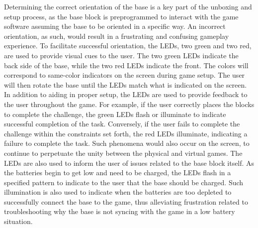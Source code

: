 \documentclass[]{article}
\begin{document}
Determining the correct orientation of the base is a key part of the unboxing and setup process, as the base block is preprogrammed to interact with the game software assuming the base to be oriented in a specific way.  An incorrect orientation, as such, would result in a frustrating and confusing gameplay experience.   To facilitate successful orientation, the LEDs, two green and two red, are used to provide visual cues to the user.  The two green LEDs indicate the back side of the base, while the two red LEDs indicate the front.  The colors will correspond to same-color indicators on the screen during game setup.  The user will then rotate the base until the LEDs match what is indicated on the screen.
In addition to aiding in proper setup, the LEDs are used to provide feedback to the user throughout the game.  For example, if the user correctly places the blocks to complete the challenge, the green LEDs flash or illuminate to indicate successful completion of the task.  Conversely, if the user fails to complete the challenge within the constraints set forth, the red LEDs illuminate, indicating a failure to complete the task.  Such phenomena would also occur on the screen, to continue to perpetuate the unity between the physical and virtual games.
The LEDs are also used to inform the user of issues related to the base block itself.  As the batteries begin to get low and need to be charged, the LEDs flash in a specified pattern to indicate to the user that the base should be charged.  Such illumination is also used to indicate when the batteries are too depleted to successfully connect the base to the game, thus alleviating frustration related to troubleshooting why the base is not syncing with the game in a low battery situation.
\end{document}
